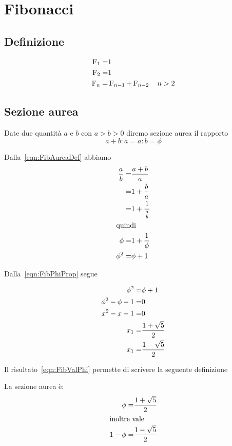 \chapter{Fibonacci}
\section{Definizione}
\begin{defn}
	\begin{align}
		\operatorname{F}_{1}=&1\notag\\
		\operatorname{F}_{2}=&1\notag\\
		\operatorname{F}_{n}=&\operatorname{F}_{n-1}+\operatorname{F}_{n-2}\quad n>2\label{eqn:Fibodef}
	\end{align}
\end{defn}
\section{Sezione aurea}
\begin{defn}
	Date due quantità $a$ e $b$ con $a>b>0$ diremo sezione aurea il rapporto
	\begin{equation}
	a+b:a=a:b=\phi	
	\end{equation}\label{eqn:FibAureaDef}
\end{defn}
\begin{prop}
	Dalla~\vref{eqn:FibAureaDef} abbiamo
	\begin{align}
		\dfrac{a}{b}=&\dfrac{a+b}{a}\notag\\
		=&1+\dfrac{b}{a}\notag\\
		=&1+\dfrac{1}{\frac{a}{b}}\notag\\
		\intertext{quindi}
		\phi=&1+\dfrac{1}{\phi}\label{eqn:FibPhiProp}\\
		\phi^2=&\phi+1\notag
	\end{align}
\end{prop}
	Dalla~\vref{eqn:FibPhiProp} segue
	\begin{prop}
	\begin{align}
		\phi^2=&\phi+1\notag\\
		\phi^2-\phi-1=&0\notag\\
		x^2-x-1=&0\label{eqn:FibValPhiEqua}\\
		x_1=&\dfrac{1+\sqrt{5}}{2}\label{eqn:FibValPhi}\\
		x_1=&\dfrac{1-\sqrt{5}}{2}\notag
	\end{align}
\end{prop}
Il risultato~\ref{eqn:FibValPhi} permette di scrivere la seguente definizione
\begin{defn}
La sezione aurea è: 
\begin{align*}
	\phi=&\dfrac{1+\sqrt{5}}{2}\\
\intertext{inoltre vale}
	1-	\phi=&\dfrac{1-\sqrt{5}}{2}\\
\end{align*}
\end{defn}
